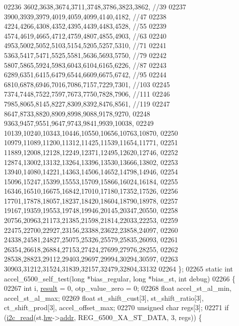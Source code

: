 \begin{DoxyCode}
{{{{{{{02236     3602,3638,3674,3711,3748,3786,3823,3862, \textcolor{comment}{//39}
02237     3900,3939,3979,4019,4059,4099,4140,4182, \textcolor{comment}{//47}
02238     4224,4266,4308,4352,4395,4439,4483,4528, \textcolor{comment}{//55}
02239     4574,4619,4665,4712,4759,4807,4855,4903, \textcolor{comment}{//63}
02240     4953,5002,5052,5103,5154,5205,5257,5310, \textcolor{comment}{//71}
02241     5363,5417,5471,5525,5581,5636,5693,5750, \textcolor{comment}{//79}
02242     5807,5865,5924,5983,6043,6104,6165,6226, \textcolor{comment}{//87}
02243     6289,6351,6415,6479,6544,6609,6675,6742, \textcolor{comment}{//95}
02244     6810,6878,6946,7016,7086,7157,7229,7301, \textcolor{comment}{//103}
02245     7374,7448,7522,7597,7673,7750,7828,7906, \textcolor{comment}{//111}
02246     7985,8065,8145,8227,8309,8392,8476,8561, \textcolor{comment}{//119}
02247     8647,8733,8820,8909,8998,9088,9178,9270,
02248     9363,9457,9551,9647,9743,9841,9939,10038,
02249     10139,10240,10343,10446,10550,10656,10763,10870,
02250     10979,11089,11200,11312,11425,11539,11654,11771,
02251     11889,12008,12128,12249,12371,12495,12620,12746,
02252     12874,13002,13132,13264,13396,13530,13666,13802,
02253     13940,14080,14221,14363,14506,14652,14798,14946,
02254     15096,15247,15399,15553,15709,15866,16024,16184,
02255     16346,16510,16675,16842,17010,17180,17352,17526,
02256     17701,17878,18057,18237,18420,18604,18790,18978,
02257     19167,19359,19553,19748,19946,20145,20347,20550,
02258     20756,20963,21173,21385,21598,21814,22033,22253,
02259     22475,22700,22927,23156,23388,23622,23858,24097,
02260     24338,24581,24827,25075,25326,25579,25835,26093,
02261     26354,26618,26884,27153,27424,27699,27976,28255,
02262     28538,28823,29112,29403,29697,29994,30294,30597,
02263     30903,31212,31524,31839,32157,32479,32804,33132
02264 \};
02265 \textcolor{keyword}{static} \textcolor{keywordtype}{int} accel\_6500\_self\_test(\textcolor{keywordtype}{long} *bias\_regular, \textcolor{keywordtype}{long} *bias\_st, \textcolor{keywordtype}{int} debug)
02266 \{
02267     \textcolor{keywordtype}{int} i, \hyperlink{sensor_8h_a4c9d9cb8bb9d2b707a152051408f40e5}{result} = 0, otp\_value\_zero = 0;
02268     \textcolor{keywordtype}{float} accel\_st\_al\_min, accel\_st\_al\_max;
02269     \textcolor{keywordtype}{float} st\_shift\_cust[3], st\_shift\_ratio[3], ct\_shift\_prod[3], accel\_offset\_max;
02270     \textcolor{keywordtype}{unsigned} \textcolor{keywordtype}{char} regs[3];
02271     \textcolor{keywordflow}{if} (\hyperlink{_i2_c_8c_ac2d47e7a6c76f93f9b537c31a2986e7b}{i2c\_read}(st.\hyperlink{structgyro__state__s_a5bac30a96752691e4cc723735060e360}{hw}->\hyperlink{structhw__s_a4c34a946600e9d68b6355d23f54d291b}{addr}, REG\_6500\_XA\_ST\_DATA, 3, regs)) \{
}}}}}}}
\end{DoxyCode}
